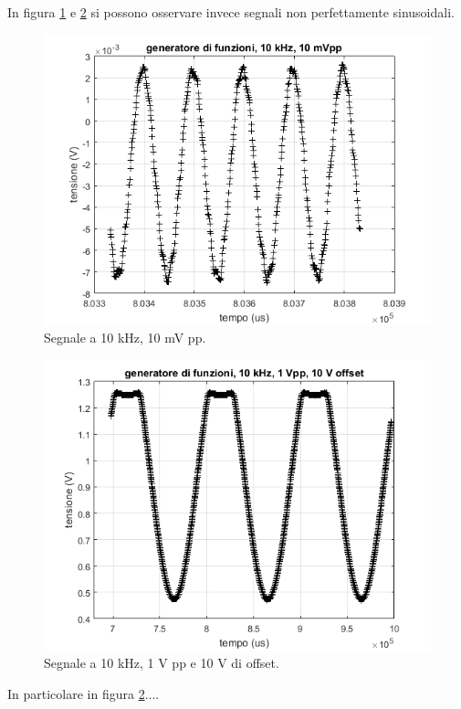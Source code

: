 \documentclass[journal, a4paper]{IEEEtran}
\begin{document}
In figura \ref{fig:prova_gen_10khz_10mpp} e \ref{fig:sballato} si possono osservare invece segnali non perfettamente sinusoidali.

\begin{figure}[htp]
\centering
\includegraphics[scale=.4]{prova_gen_10khz_10mpp}
\caption{Segnale a 10 kHz, 10 mV pp.}
\label{fig:prova_gen_10khz_10mpp}
\end{figure}

\begin{figure}[htp]
\centering
\includegraphics[scale=.4]{sballato}
\caption{Segnale a 10 kHz, 1 V pp e 10 V di offset.}
\label{fig:sballato}
\end{figure}

In particolare in figura \ref{fig:sballato}....
\end{document}
